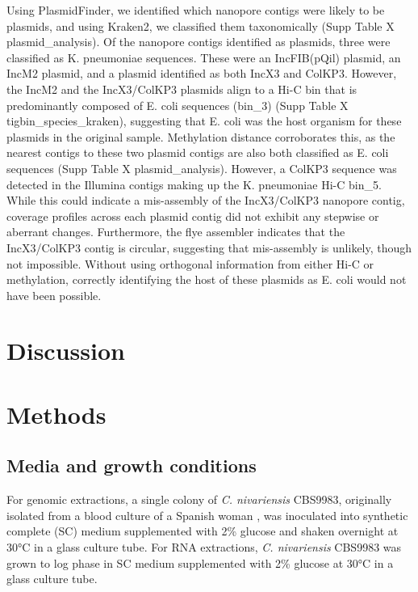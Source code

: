 Using PlasmidFinder, we identified which nanopore contigs were likely to be plasmids, and using Kraken2, we classified them taxonomically (Supp Table X plasmid_analysis). Of the nanopore contigs identified as plasmids, three were classified as K. pneumoniae sequences. These were an IncFIB(pQil) plasmid, an IncM2 plasmid, and a plasmid identified as both IncX3 and ColKP3. However, the IncM2 and the IncX3/ColKP3 plasmids align to a Hi-C bin that is predominantly composed of E. coli sequences (bin_3) (Supp Table X tigbin_species_kraken), suggesting that E. coli was the host organism for these plasmids in the original sample. Methylation distance corroborates this, as the nearest contigs to these two plasmid contigs are also both classified as E. coli sequences (Supp Table X plasmid_analysis). However, a ColKP3 sequence was detected in the Illumina contigs making up the K. pneumoniae Hi-C bin_5. While this could indicate a mis-assembly of the IncX3/ColKP3 nanopore contig, coverage profiles across each plasmid contig did not exhibit any stepwise or aberrant changes. Furthermore, the flye assembler indicates that the IncX3/ColKP3 contig is circular, suggesting that mis-assembly is unlikely, though not impossible. Without using orthogonal information from either Hi-C or methylation, correctly identifying the host of these plasmids as E. coli would not have been possible.

\section{Discussion}
\label{sec:discuss}



\section{Methods}
\label{sec:methods}

\subsection{Media and growth conditions}
\label{sec:methods}

For genomic extractions, a single colony of \textit{C. nivariensis} CBS9983, originally isolated from a blood culture of a Spanish woman \citep{Alcoba-Florez2005-xn}, was inoculated into synthetic complete (SC) medium supplemented with 2\% glucose and shaken overnight at 30°C in a glass culture tube. For RNA extractions, \textit{C. nivariensis} CBS9983 was grown to log phase in SC medium supplemented with 2\% glucose at 30°C in a glass culture tube.

